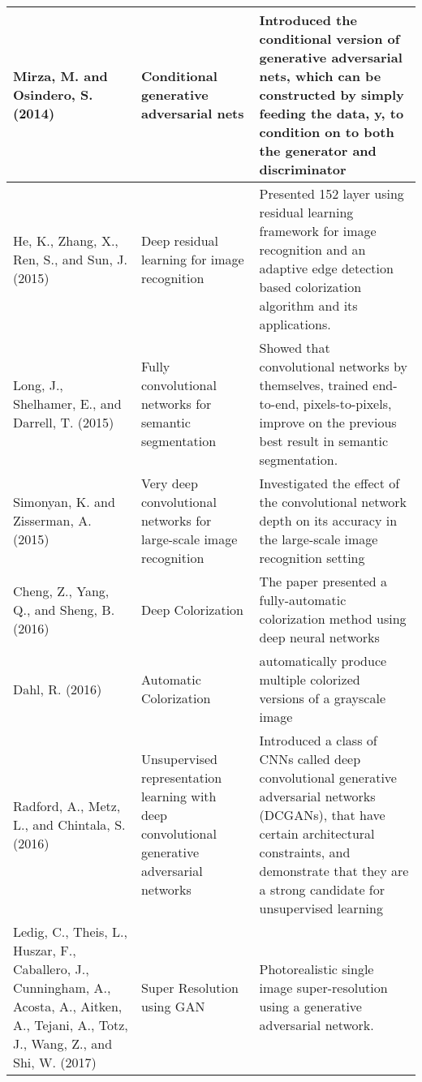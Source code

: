 \documentclass[12pt]{article}
\begin{document}
\begin{tabularx}{\textwidth}{| X | X | X | }
Mirza, M. and Osindero, S. (2014) &  Conditional generative adversarial nets & Introduced the conditional version of generative adversarial nets, which can be constructed by simply feeding the data, y, to condition on to both the generator and discriminator\\ \hline

He, K., Zhang, X., Ren, S., and Sun, J. (2015) & Deep residual learning for image recognition & Presented 152 layer using residual learning framework for image recognition and an adaptive edge detection based colorization algorithm and its applications.\\ \hline


Long, J., Shelhamer, E., and Darrell, T. (2015) &  Fully convolutional networks for semantic segmentation &  Showed that convolutional networks by themselves, trained end-to-end, pixels-to-pixels, improve on the previous best result in semantic segmentation.\\ \hline

Simonyan, K. and Zisserman, A. (2015) & Very deep convolutional networks for large-scale image recognition & Investigated the effect of the convolutional network depth on its accuracy in the large-scale image recognition setting\\ \hline

Cheng, Z., Yang, Q., and Sheng, B. (2016) &	Deep Colorization &	 The paper presented a fully-automatic colorization method using deep neural networks\\ \hline

Dahl, R. (2016) &	Automatic Colorization & automatically produce multiple colorized versions of a grayscale image\\ \hline


Radford, A., Metz, L., and Chintala, S. (2016) &  Unsupervised representation learning with deep convolutional generative adversarial networks & Introduced a class of CNNs called deep convolutional generative adversarial networks (DCGANs), that have certain architectural constraints, and demonstrate that they are a strong candidate for unsupervised learning\\ \hline

Ledig, C., Theis, L., Huszar, F., Caballero, J., Cunningham, A., Acosta, A., Aitken, A., Tejani, A., Totz, J., Wang, Z., and Shi, W. (2017) &  Super Resolution using GAN & Photorealistic single image super-resolution using a generative adversarial network.\\ \hline


\end{tabularx}
\end{document}
